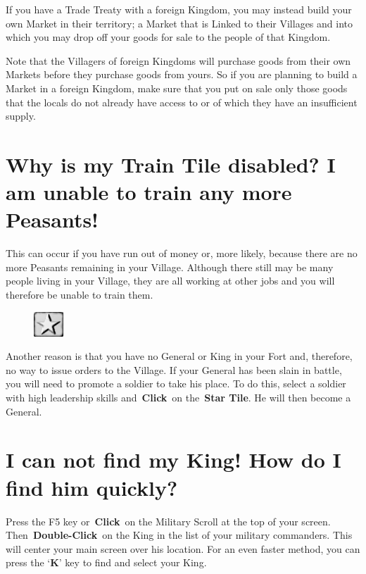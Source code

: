 If you have a Trade Treaty with a foreign Kingdom, you may instead build your own Market in their territory; a Market that is Linked to their Villages and into which you may drop off your goods for sale to the people of that Kingdom.

Note that the Villagers of foreign Kingdoms will purchase goods from their own Markets before they purchase goods from yours. So if you are planning to build a Market in a foreign Kingdom, make sure that you put on sale only those goods that the locals do not already have access to or of which they have an insufficient supply.

\section{Why is my Train Tile disabled? I am unable to train any more Peasants!}

This can occur if you have run out of money or, more likely, because there are no more Peasants remaining in your Village. Although there still may be many people living in your Village, they are all working at other jobs and you will therefore be unable to train them.

\begin{figure}
	\vspace{-20pt}
	\begin{center}
		\includegraphics[width=0.1\textwidth]{Tstar}
	\end{center}
	\vspace{-20pt}
\end{figure}

Another reason is that you have no General or King in your Fort and, therefore, no way to issue orders to the Village. If your General has been slain in battle, you will need to promote a soldier to take his place. To do this, select a soldier with high leadership skills and \textbf{Click} on the \textbf{Star Tile}. He will then become a General.

\section{I can not find my King! How do I find him quickly?}

Press the F5 key or \textbf{Click} on the Military Scroll at the top of your screen. Then \textbf{Double-Click} on the King in the list of your military commanders. This will center your main screen over his location. For an even faster method, you can press the ‘\textbf{K}’ key to find and select your King.

